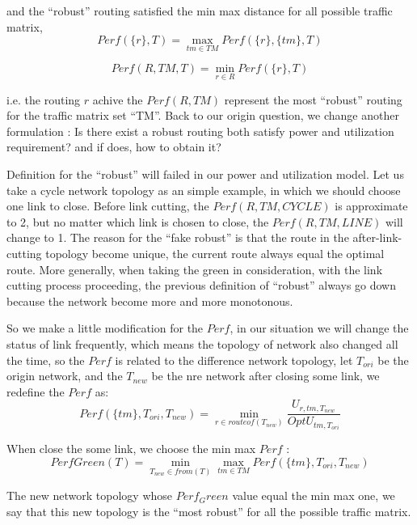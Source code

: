 \documentclass[conference]{IEEEtran}
\begin{document}
and the ``robust'' routing satisfied the min max distance for all possible traffic matrix, 
\begin{equation}
Perf(\{ r \}, T) = \max_{tm\in TM} Perf(\{ r \}, \{ tm \}, T)
\end{equation}

\begin{equation}
Perf(R, TM, T) = \min_{r\in R} Perf(\{ r \}, T)
\end{equation}

i.e. the routing $r$ achive the $Perf(R,TM)$ represent the most ``robust'' routing for the traffic matrix set ``TM''. Back to our
origin question, we change another formulation : Is there exist a robust routing both satisfy power and utilization requirement?
and if does, how to obtain it?

Definition for the ``robust'' will failed in our power and utilization model. Let us take a cycle network topology as an simple example,
in which we should choose one link to close. Before link cutting, the $Perf(R, TM, CYCLE)$ is approximate to 2, but no matter which 
link is chosen to close, the $Perf(R, TM, LINE)$ will change to 1. The reason for the ``fake robust'' is that the route in the 
after-link-cutting topology become unique, the current route always equal the optimal route. More generally, when taking the green in
consideration, with the link cutting process proceeding, the previous definition of ``robust'' always go down because the network become
more and more monotonous.

So we make a little modification for the $Perf$, in our situation we will change the status of link frequently, which means
the topology of network also changed all the time, so the $Perf$ is related to the difference network topology, 
let $T_{ori}$ be the origin network, and the $T_{new}$ be the nre network after closing some link, we redefine the $Perf$ as:
\begin{equation}
Perf(\{ tm\}, T_{ori}, T_{new}) = \min_{r \in routeof(T_{new})} \frac{U_{r,tm,T_{new}}}{OptU_{tm,T_{ori}}}
\end{equation}

When close the some link, we choose the min max $Perf$ :
\begin{equation}
PerfGreen(T) = \min_{T_{new}\in from(T)} \max_{tm \in TM} Perf(\{ tm \}, T_{ori}, T_{new})
\end{equation}

The new network topology whose $Perf_Green$ value equal the min max one, we say that this new topology is the ``most robust'' for
all the possible traffic matrix.
\end{document}

